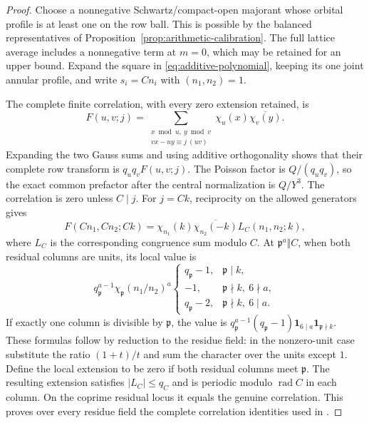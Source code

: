 \documentclass[11pt,a4paper]{article}
\numberwithin{equation}{section}
\theoremstyle{definition}
\theoremstyle{remark}
\begin{document}
\begin{proof}
Choose a nonnegative Schwartz/compact-open majorant whose orbital
profile is at least one on the row ball.  This is possible by the
balanced representatives of Proposition~\ref{prop:arithmetic-calibration}.
The full lattice average includes a nonnegative term at $m=0$, which
may be retained for an upper bound.  Expand the square in
\eqref{eq:additive-polynomial}, keeping its one joint annular profile,
and write $s_i=Cn_i$ with $(n_1,n_2)=1$.

The complete finite correlation, with every zero extension retained, is
\begin{equation}\label{eq:full-additive-correlation}
 F(u,v;j)=\sum_{\substack{x\bmod u,\ y\bmod v\\
                         vx-uy\equiv j\ (uv)}}
                         \chi_u(x)\overline{\chi_v(y)}.
\end{equation}
Expanding the two Gauss sums and using additive orthogonality shows
that their complete row transform is $q_uq_vF(u,v;j)$.
The Poisson factor is $Q/(q_uq_v)$, so the exact common prefactor after
the central normalization is $Q/Y^3$.
The correlation is zero unless $C\mid j$.  For $j=Ck$, reciprocity on
the allowed generators gives
\begin{equation}\label{eq:correlation-common-part}
 F(Cn_1,Cn_2;Ck)
 =\chi_{n_1}(k)\overline{\chi_{n_2}(-k)}L_C(n_1,n_2;k),
\end{equation}
where $L_C$ is the corresponding congruence sum modulo $C$.
At $\mathfrak p^a\Vert C$, when both residual columns are units, its
local value is
\[
 q_{\mathfrak p}^{a-1}\chi_{\mathfrak p}(n_1/n_2)^a
 \begin{cases}
 q_{\mathfrak p}-1,&\mathfrak p\mid k,\\
 -1,&\mathfrak p\nmid k,\ 6\nmid a,\\
 q_{\mathfrak p}-2,&\mathfrak p\nmid k,\ 6\mid a.
 \end{cases}
\]
If exactly one column is divisible by $\mathfrak p$, the value is
$q_{\mathfrak p}^{a-1}(q_{\mathfrak p}-1)
\mathbf1_{6\mid a}\mathbf1_{\mathfrak p\nmid k}$.
These formulas follow by reduction to the residue field: in the
nonzero-unit case substitute the ratio $(1+t)/t$ and sum the character
over the units except $1$.  Define the local extension to be zero if
both residual columns meet $\mathfrak p$.  The resulting extension
satisfies $|L_C|\le q_C$ and is periodic modulo $\operatorname{rad}C$
in each column.  On the coprime residual locus it equals the genuine
correlation.  This proves over every residue field the complete
correlation identities used in \cite[Lemma~13.3]{Q}.


\end{proof}
\end{document}

